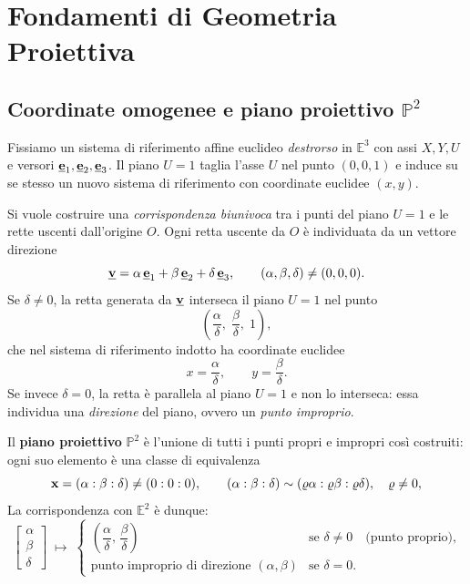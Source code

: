\section{Fondamenti di Geometria Proiettiva}
\label{sec:geom_proj}

\subsection{Coordinate omogenee e piano proiettivo \(\mathbb{P}^2\)}
\label{sub:coord_omogenee}

Fissiamo un sistema di riferimento affine euclideo \emph{destrorso}
in \(\mathbb{E}^3\) con assi \(X,Y,U\) e versori
\(\underline{\mathbf{e}}_1,\underline{\mathbf{e}}_2,\underline{\mathbf{e}}_3\). Il piano \(U=1\) taglia
l'asse \(U\) nel punto \((0,0,1)\) e induce su se stesso un nuovo
sistema di riferimento con coordinate euclidee \((x,y)\).

Si vuole costruire una \emph{corrispondenza biunivoca} tra i punti del
piano \(U=1\) e le rette uscenti dall'origine \(O\). Ogni retta
uscente da \(O\) è individuata da un vettore direzione
\[
  \underline{\mathbf{v}}
  = \alpha\,\underline{\mathbf{e}}_1 + \beta\,\underline{\mathbf{e}}_2 + \delta\,\underline{\mathbf{e}}_3,
  \qquad (\alpha,\beta,\delta)\neq(0,0,0).
\]
Se \(\delta\neq 0\), la retta generata da \(\underline{\mathbf{v}}\) interseca il
piano \(U=1\) nel punto
\[
  \left(\frac{\alpha}{\delta},\;\frac{\beta}{\delta},\;1\right),
\]
che nel sistema di riferimento indotto ha coordinate euclidee
\[
  x = \frac{\alpha}{\delta}, \qquad y = \frac{\beta}{\delta}.
\]
Se invece \(\delta=0\), la retta è parallela al piano \(U=1\) e non
lo interseca: essa individua una \emph{direzione} del piano,
ovvero un \emph{punto improprio}.

Il \textbf{piano proiettivo} \(\mathbb{P}^2\) è l'unione di tutti i
punti propri e impropri così costruiti: ogni suo elemento è
una classe di equivalenza
\[
  \mathbf{x} = (\alpha:\beta:\delta)\neq(0:0:0),
  \qquad
  (\alpha:\beta:\delta)\sim(\varrho\alpha:\varrho\beta:\varrho\delta),
  \quad\varrho\neq 0,
\]
La corrispondenza con \(\mathbb{E}^2\) è dunque:
\[
  \begin{bmatrix}\alpha\\\beta\\\delta\end{bmatrix}
  \;\longmapsto\;
  \begin{cases}
    \left(\dfrac{\alpha}{\delta},\,\dfrac{\beta}{\delta}\right)
      & \text{se } \delta\neq 0 \quad\text{(punto proprio),}\\[8pt]
    \text{punto improprio di direzione }(\alpha,\beta)
      & \text{se } \delta=0.
  \end{cases}
\]

